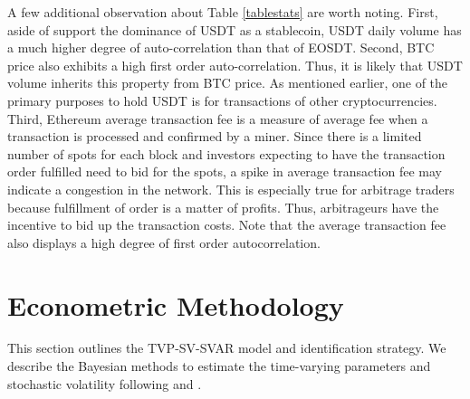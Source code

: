 \documentclass[12pt]{article}
\begin{document}
A few additional observation about Table \ref{tablestats} are worth noting. First, aside of support the dominance of USDT as a stablecoin, USDT daily volume has a much higher degree of auto-correlation than that of EOSDT. Second, BTC price also exhibits a high first order auto-correlation. Thus, it is likely that USDT volume inherits this property from BTC price. As mentioned earlier, one of the primary purposes to hold USDT is for transactions of other cryptocurrencies. Third, Ethereum average transaction fee is a measure of average fee when a transaction is processed and confirmed by a miner. Since there is a limited number of spots for each block and investors expecting to have the transaction order fulfilled need to bid for the spots, a spike in average transaction fee may indicate a congestion in the network. This is especially true for arbitrage traders because fulfillment of order is a matter of profits. Thus, arbitrageurs have the incentive to bid up the transaction costs. Note that the average transaction fee also displays a high degree of first order autocorrelation.



\section{Econometric Methodology}
This section outlines the TVP-SV-SVAR model and identification strategy. We describe the Bayesian methods to estimate the time-varying parameters and stochastic volatility following \cite{primiceri} and \cite{cfp}. 
\end{document}
